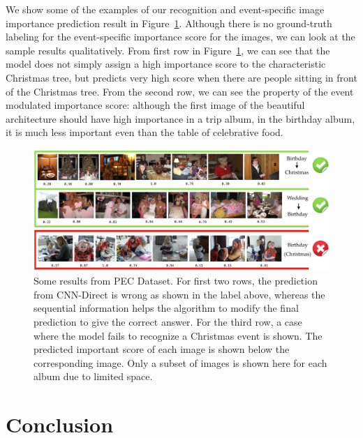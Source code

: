\documentclass[runningheads]{llncs}
\begin{document}
We show some of the examples of our recognition and event-specific image importance prediction result in Figure~\ref{pec_result}. Although there is no ground-truth labeling for the event-specific importance score for the images, we can look at the sample results qualitatively. From first row in Figure~\ref{pec_result}, we can see that the model does not simply assign a high importance score to the characteristic Christmas tree, but predicts very high score when there are people sitting in front of the Christmas tree. From the second row, we can see the property of the event modulated importance score: although the first image of the beautiful architecture should have high importance in a trip album, in the birthday album, it is much less important even than the table of celebrative food.
\begin{figure}
\centering
\includegraphics[width=4.8in]{pec_result}
\caption{Some results from PEC Dataset. For first two rows, the prediction from CNN-Direct is wrong as shown in the label above, whereas the sequential information helps the algorithm to modify the final prediction to give the correct answer. For the third row, a case where the model fails to recognize a Christmas event is shown. The predicted important score of each image is shown below the corresponding image. Only a subset of images is shown here for each album due to limited space.}
\label{pec_result}
\vspace{-0.15in}
\end{figure}

\section{Conclusion}
\clearpage



\end{document}
